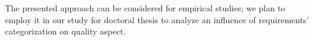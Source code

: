 The presented approach can be considered for empirical studies; we plan to employ it in our study 
for doctoral thesis to analyze an influence of requirements' categorization on quality aspect. 

